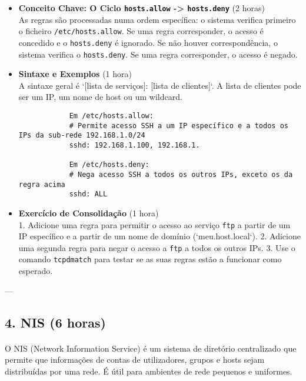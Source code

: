 \documentclass[10pt,a4paper]{article}
\begin{document}
	\begin{itemize}
		\item \textbf{Conceito Chave: O Ciclo \texttt{hosts.allow} -> \texttt{hosts.deny}} (2 horas) \\
		As regras são processadas numa ordem específica: o sistema verifica primeiro o ficheiro \texttt{/etc/hosts.allow}. Se uma regra corresponder, o acesso é concedido e o \texttt{hosts.deny} é ignorado. Se não houver correspondência, o sistema verifica o \texttt{hosts.deny}. Se uma regra corresponder, o acesso é negado.
		
		\item \textbf{Sintaxe e Exemplos} (1 hora) \\
		A sintaxe geral é `[lista de serviços]: [lista de clientes]`. A lista de clientes pode ser um IP, um nome de host ou um wildcard.
		\begin{verbatim}
			Em /etc/hosts.allow:
			# Permite acesso SSH a um IP específico e a todos os IPs da sub-rede 192.168.1.0/24
			sshd: 192.168.1.100, 192.168.1.
			
			Em /etc/hosts.deny:
			# Nega acesso SSH a todos os outros IPs, exceto os da regra acima
			sshd: ALL
		\end{verbatim}
		
		\item \textbf{Exercício de Consolidação} (1 hora) \\
		1. Adicione uma regra para permitir o acesso ao serviço \texttt{ftp} a partir de um IP específico e a partir de um nome de domínio (`meu.host.local`).
		2. Adicione uma segunda regra para negar o acesso a \texttt{ftp} a todos os outros IPs.
		3. Use o comando \texttt{tcpdmatch} para testar se as suas regras estão a funcionar como esperado.
	\end{itemize}
	
	---
	
	\subsection*{4. NIS (6 horas)}
	\vspace{-1.2em}
	\paragraph{}
	O NIS (Network Information Service) é um sistema de diretório centralizado que permite que informações de contas de utilizadores, grupos e hosts sejam distribuídas por uma rede. É útil para ambientes de rede pequenos e uniformes.
	
\end{document}
